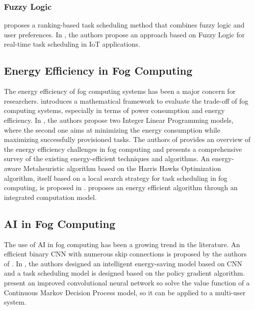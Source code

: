 \subsubsection*{Fuzzy Logic}

\cite{benblidia-et-al-2019} proposes a ranking-based task scheduling method that combines fuzzy logic and user
preferences. In \cite{ali-et-al-2021}, the authors propose an approach based on Fuzzy Logic for real-time task
scheduling in IoT applications.

\subsection*{Energy Efficiency in Fog Computing}

The energy efficiency of fog computing systems has been a major concern for researchers. \cite{alhumaima-2020}
introduces a mathematical framework to evaluate the trade-off of fog computing systems, especially in terms of power
consumption and energy efficiency. In \cite{he-et-al-2020}, the authors propose two Integer Linear Programming models,
where the second one aims at minimizing the energy consumption while maximizing successfully provisioned tasks. The
authors of \cite{malik-et-al-2022} provides an overview of the energy efficiency challenges in fog computing and
presents a comprehensive survey of the existing energy-efficient techniques and algorithms. An energy-aware
Metaheuristic algorithm based on the Harris Hawks Optimization algorithm, itself based on a local search strategy for
task scheduling in fog computing, is proposed in \cite{abdel-basset-et-al-2021}. \cite{wang-et-al-2023} proposes an
energy efficient algorithm through an integrated computation model.

\subsection*{AI in Fog Computing}

The use of AI in fog computing has been a growing trend in the literature. An efficient binary CNN with numerous skip
connections is proposed by the authors of \cite{wu-et-al-2021}. In \cite{yang-et-al-2022}, the authors designed an
intelligent energy-saving model based on CNN and a task scheduling model is designed based on the policy gradient
algorithm. \cite{jing-xue-2023} present an improved convolutional neural network so solve the value function of a
Continuous Markov Decision Process model, so it can be applied to a multi-user system.
